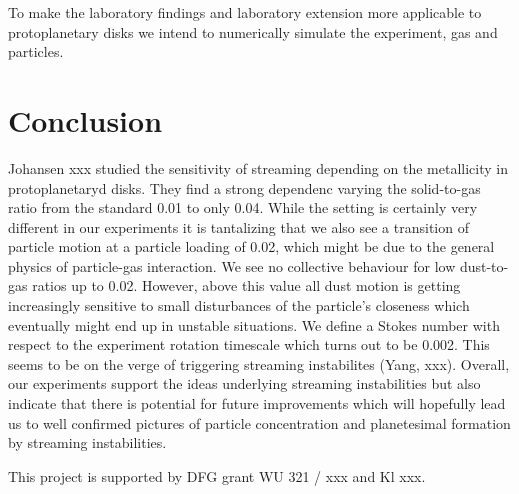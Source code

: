 To make the laboratory findings and laboratory extension more applicable to protoplanetary disks we intend to numerically simulate the experiment, gas and particles.

\section{Conclusion}

Johansen xxx studied the sensitivity of streaming depending on the metallicity in
protoplanetaryd disks. They find a strong dependenc varying
the solid-to-gas ratio from the standard 0.01 to only 0.04. While the setting is certainly very different in our experiments it is tantalizing that we also see a transition of particle motion at a particle loading of 0.02, which might be due to the general physics of 
particle-gas interaction. We see no collective behaviour for low dust-to-gas ratios up to 0.02. However, above this value all dust motion is getting increasingly sensitive to
small disturbances of the particle's closeness which eventually might end up in unstable situations. 
We define a Stokes number with respect to the experiment rotation timescale which turns out to be 0.002. This seems to be on the verge of triggering streaming instabilites (Yang,   xxx). 
Overall, our experiments support the ideas underlying streaming instabilities but also indicate that there is potential for future improvements which will hopefully lead us to well confirmed pictures of particle concentration and planetesimal formation by streaming instabilities.

\begin{acknowledgements}
This project is supported by DFG grant WU 321 / xxx and Kl xxx.
\end{acknowledgements}


\begin{thebibliography}{}
%
%


\end{thebibliography}



